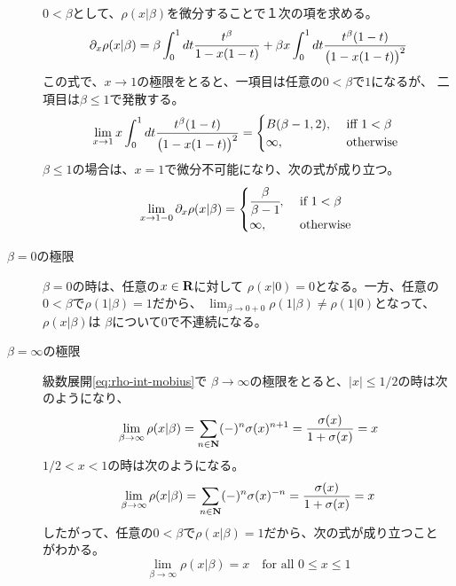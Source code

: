 \documentclass{jsarticle}
\begin{document}
\begin{description}
\begin{equation*}
	\end{equation*}
	$0<\beta$として、$\rho(x|\beta)$を微分することで１次の項を求める。
	\begin{equation*}
		\partial_x\rho(x|\beta) = \beta\int_0^1 dt \frac{t^\beta}{1 - x(1 - t)}
		+ \beta x\int_0^1 dt \frac{t^\beta(1 - t)}{\mathinner{\bigl({1 - x(1 - t)}\bigr)}^2}
	\end{equation*}
	この式で、$x\to1$の極限をとると、一項目は任意の$0<\beta$で$1$になるが、
	二項目は$\beta\le1$で発散する。
	\begin{equation*}
		\lim_{x\to1} x\int_0^1 dt \frac{t^\beta(1 - t)}{\mathinner{\bigl({1 - x(1 - t)}\bigr)}^2}
		= \begin{cases}
			B(\beta - 1, 2), &\text{ iff } 1 < \beta \\
			\infty, &\text{ otherwise } \\
		\end{cases}
	\end{equation*}
	$\beta\le1$の場合は、$x=1$で微分不可能になり、次の式が成り立つ。
	\begin{equation*}
		\lim_{x\to1-0}\partial_x\rho(x|\beta)
		= \begin{cases}
			\cfrac{\beta}{\beta - 1}, &\text{ if } 1 < \beta \\
			\infty, &\text{ otherwise } \\
		\end{cases}
	\end{equation*}
	\item[$\beta=0$の極限] $\beta=0$の時は、任意の$x\in\mathbf{R}$に対して
	$\rho(x|0)=0$となる。一方、任意の$0<\beta$で$\rho(1|\beta)=1$だから、
	$\lim_{\beta\to0+0}\rho(1|\beta)\neq\rho(1|0)$となって、$\rho(x|\beta)$は
	$\beta$について$0$で不連続になる。
	\item[$\beta=\infty$の極限] 級数展開\eqref{eq:rho-int-mobius}で
	$\beta\to\infty$の極限をとると、$|x|\le1/2$の時は次のようになり、
	\begin{equation*}
		\lim_{\beta\to\infty}\rho(x|\beta)
		= \sum_{n\in\mathbf{N}}(-)^n\sigma(x)^{n+1}
		= \frac{\sigma(x)}{1 + \sigma(x)} = x
	\end{equation*}
	$1/2<x<1$の時は次のようになる。
	\begin{equation*}
		\lim_{\beta\to\infty}\rho(x|\beta)
		= \sum_{n\in\mathbf{N}}(-)^n\sigma(x)^{-n}
		= \frac{\sigma(x)}{1 + \sigma(x)} = x
	\end{equation*}
	したがって、任意の$0<\beta$で$\rho(x|\beta)=1$だから、次の式が成り立つこと
	がわかる。
	\begin{equation*}
		\lim_{\beta\to\infty}\rho(x|\beta) = x \quad\text{for all } 0\le x\le 1
	\end{equation*}
\end{description} %
\end{document}
